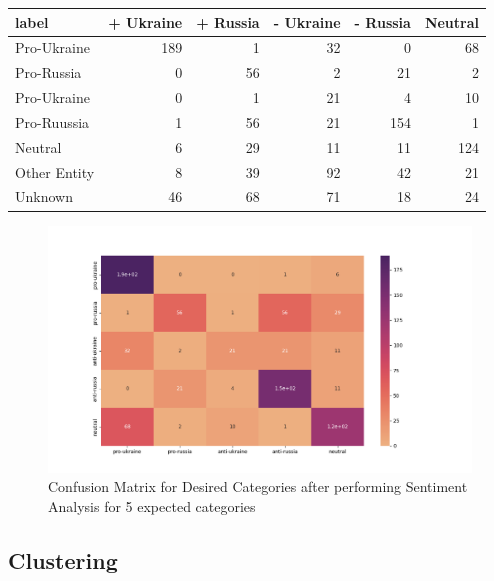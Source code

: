 \documentclass[12pt,letterpaper,oneside,titlepage]{article}
\begin{document}
\begin{center}
    \begin{tabular}{lrrrrr}
        \toprule
        label        & + Ukraine & + Russia & - Ukraine & - Russia & Neutral \\
        \midrule
        Pro-Ukraine  & 189       & 1        & 32        & 0        & 68      \\
        Pro-Russia   & 0         & 56       & 2         & 21       & 2       \\
        Pro-Ukraine  & 0         & 1        & 21        & 4        & 10      \\
        Pro-Ruussia  & 1         & 56       & 21        & 154      & 1       \\
        Neutral      & 6         & 29       & 11        & 11       & 124     \\
        Other Entity & 8         & 39       & 92        & 42       & 21      \\
        Unknown      & 46        & 68       & 71        & 18       & 24      \\
        \bottomrule
    \end{tabular}
    \captionsetup{justification=centering}
    \label{siatable}
\end{center}

\begin{figure}[ht]
    \centering
    \includegraphics[scale=0.67]{quadclass-sia-cf}
    \captionsetup{justification=centering}
    \caption{Confusion Matrix for Desired Categories after performing Sentiment Analysis for 5 expected categories}
\end{figure}
\FloatBarrier
\pagebreak
\subsection{Clustering}
\end{document}
